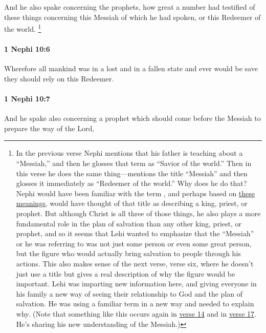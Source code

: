 			And he also spake concerning the prophets,
			how great a number had testified of these things
			concerning this Messiah of which he had spoken,
			or this Redeemer of the world.%
				\footnote{%
					\label{1NEPHI-10-5-NOTE-or}%
					In the previous verse Nephi mentions that his father is teaching about a ``Messiah,'' and then he glosses that term as ``Savior of the world.'' Then in this verse he does the same thing---mentions the title ``Messiah'' and then glosses it immediately as ``Redeemer of the world.'' Why does he do that? Nephi would have been familiar with the term , and perhaps based on \hyperref[MESSIAH-HEBREW]{these meanings}, would have thought of that title as describing a king, priest, or prophet. But although Christ is all three of those things, he also plays a more fundamental role in the plan of salvation than any other king, priest, or prophet, and so it seems that Lehi wanted to emphasize that the ``Messiah'' or  he was referring to was not just some person or even some great person, but the figure who would actually bring salvation to people through his actions. This also makes sense of the next verse, verse six, where he doesn't just use a title but gives a real description of why the figure would be important. Lehi was imparting new information here, and giving everyone in his family a new way of seeing their relationship to God and the plan of salvation. He was using a familiar term in a new way and needed to explain why. (Note that something like this occurs again in \hyperref[1NEPHI-10-14]{verse 14} and in \hyperref[1NEPHI-10-17]{verse 17}. He's sharing his new understanding of the Messiah.)
					}

		\paragraph{1 Nephi 10:6} %
			\label{1NEPHI-10-6}

			Wherefore all mankind was in a lost and in a fallen state and ever would be
			save they should rely on this Redeemer.

		\paragraph{1 Nephi 10:7} %
			\label{1NEPHI-10-7}

			And he spake also concerning a prophet
			which should come before the Messiah to prepare the way of the Lord,

